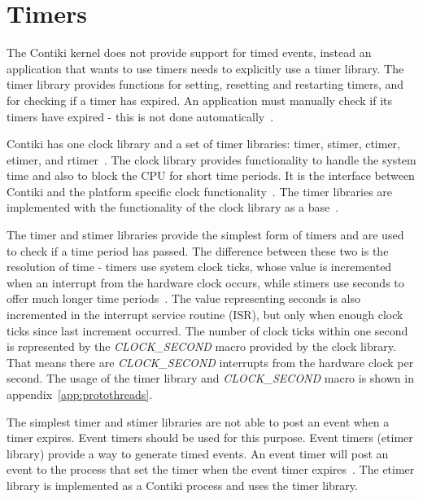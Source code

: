 
\section{Timers}\label{sec:contiki-timers}
The Contiki kernel does not provide support for timed events,
instead an application that wants to use timers needs to explicitly use a timer library.
The timer library provides functions for setting, resetting and restarting timers,
and for checking if a timer has expired.
An application must manually check if its timers have expired - this is not done automatically~\cite{contiki-docs}.

Contiki has one clock library and a set of timer libraries: timer, stimer, ctimer, etimer, and rtimer~\cite{contiki-wiki-timers}.
The clock library provides functionality to handle the system time and also to block the CPU for short time periods.
It is the interface between Contiki and the platform specific clock functionality~\cite{contiki-docs}.
The timer libraries are implemented with the functionality of the clock library as a base~\cite{contiki-wiki-timers}.

The timer and stimer libraries provide the simplest form of timers and are used to check if a time period has passed.
The difference between these two is the resolution of time -
timers use system clock ticks, whose value is incremented when an interrupt from the hardware clock occurs,
while stimers use seconds to offer much longer time periods~\cite{contiki-wiki-timers}.
The value representing seconds is also incremented in the interrupt service routine (ISR),
but only when enough clock ticks since last increment occurred.
The number of clock ticks within one second is represented by the
{\it{CLOCK\_SECOND}} macro provided by the clock library.
That means there are {\it{CLOCK\_SECOND}} interrupts from the hardware clock per second.
The usage of the timer library and {\it{CLOCK\_SECOND}} macro is shown in appendix~\ref{app:protothreads}.

The simplest timer and stimer libraries are not able to post an event when a timer expires.
Event timers should be used for this purpose.
Event timers (etimer library) provide a way to generate timed events.
An event timer will post an event to the process that set the timer when the
event timer expires~\cite{contiki-docs}.
The etimer library is implemented as a Contiki process and uses the timer library.

